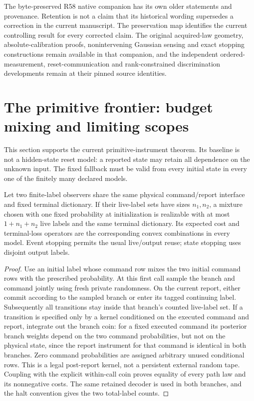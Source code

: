 The byte-preserved R58 native companion has its own older statements and provenance. Retention is not a claim that its historical wording supersedes a correction in the current manuscript. The preservation map identifies the current controlling result for every corrected claim. The original acquired-law geometry, absolute-calibration proofs, nonintervening Gaussian sensing and exact stopping constructions remain available in that companion, and the independent ordered-measurement, reset-communication and rank-constrained discrimination developments remain at their pinned source identities.

\section{The primitive frontier: budget mixing and limiting scopes}
This section supports the current primitive-instrument theorem. Its baseline is not a hidden-state reset model: a reported state may retain all dependence on the unknown input. The fixed fallback must be valid from every initial state in every one of the finitely many declared models.

\begin{lemma}\label{lem:supp-mixture}
Let two finite-label observers share the same physical command/report interface and fixed terminal dictionary. If their live-label sets have sizes $n_1,n_2$, a mixture chosen with one fixed probability at initialization is realizable with at most $1+n_1+n_2$ live labels and the same terminal dictionary. Its expected cost and terminal-loss operators are the corresponding convex combinations in every model. Event stopping permits the usual live/output reuse; state stopping uses disjoint output labels.
\end{lemma}
\begin{proof}
Use an initial label whose command row mixes the two initial command rows with the prescribed probability. At this first call sample the branch and command jointly using fresh private randomness. On the current report, either commit according to the sampled branch or enter its tagged continuing label. Subsequently all transitions stay inside that branch's counted live-label set. If a transition is specified only by a kernel conditioned on the executed command and report, integrate out the branch coin: for a fixed executed command its posterior branch weights depend on the two command probabilities, but not on the physical state, since the report instrument for that command is identical in both branches. Zero command probabilities are assigned arbitrary unused conditional rows. This is a legal post-report kernel, not a persistent external random tape. Coupling with the explicit within-call coin proves equality of every path law and its nonnegative costs. The same retained decoder is used in both branches, and the halt convention gives the two total-label counts.
\end{proof}

